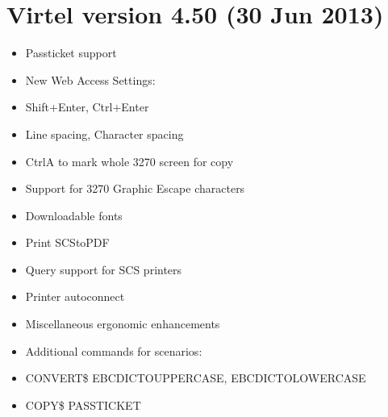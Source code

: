 \documentclass[letterpaper,10pt,english]{sphinxmanual}
\begin{document}
\section{Virtel version 4.50 (30 Jun 2013)}
\label{\detokenize{Installation_Guide:virtel-version-4-50-30-jun-2013}}
\sphinxAtStartPar
{}
\begin{itemize}
\item {} 
\sphinxAtStartPar
Passticket support

\item {} 
\sphinxAtStartPar
New Web Access Settings:

\item {} 
\sphinxAtStartPar
Shift+Enter, Ctrl+Enter

\item {} 
\sphinxAtStartPar
Line spacing, Character spacing

\item {} 
\sphinxAtStartPar
Ctrl\sphinxhyphen{}A to mark whole 3270 screen for copy

\item {} 
\sphinxAtStartPar
Support for 3270 Graphic Escape characters

\item {} 
\sphinxAtStartPar
Downloadable fonts

\item {} 
\sphinxAtStartPar
Print SCS\sphinxhyphen{}to\sphinxhyphen{}PDF

\item {} 
\sphinxAtStartPar
Query support for SCS printers

\item {} 
\sphinxAtStartPar
Printer autoconnect

\item {} 
\sphinxAtStartPar
Miscellaneous ergonomic enhancements

\end{itemize}

\sphinxAtStartPar
{}
\begin{itemize}
\item {} 
\sphinxAtStartPar
Additional commands for scenarios:

\item {} 
\sphinxAtStartPar
CONVERT\$ EBCDIC\sphinxhyphen{}TO\sphinxhyphen{}UPPERCASE, EBCDIC\sphinxhyphen{}TO\sphinxhyphen{}LOWERCASE

\item {} 
\sphinxAtStartPar
COPY\$ PASSTICKET

\end{itemize}
\end{document}
